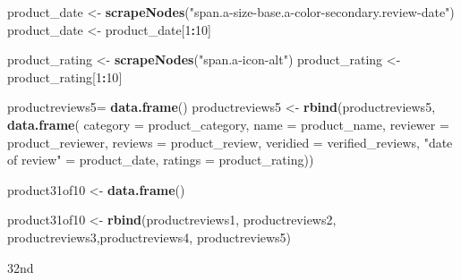 \documentclass[
]{article}
\newenvironment{Shaded}{\begin{snugshade}}{\end{snugshade}}
\newcommand{\AttributeTok}[1]{\textcolor[rgb]{0.13,0.29,0.53}{#1}}
\newcommand{\DecValTok}[1]{\textcolor[rgb]{0.00,0.00,0.81}{#1}}
\newcommand{\FunctionTok}[1]{\textcolor[rgb]{0.13,0.29,0.53}{\textbf{#1}}}
\newcommand{\NormalTok}[1]{#1}
\newcommand{\OtherTok}[1]{\textcolor[rgb]{0.56,0.35,0.01}{#1}}
\newcommand{\SpecialCharTok}[1]{\textcolor[rgb]{0.81,0.36,0.00}{\textbf{#1}}}
\newcommand{\StringTok}[1]{\textcolor[rgb]{0.31,0.60,0.02}{#1}}
\begin{document}
\begin{Shaded}
\begin{Highlighting}[]
\NormalTok{  product\_date }\OtherTok{\textless{}{-}} \FunctionTok{scrapeNodes}\NormalTok{(}\StringTok{"span.a{-}size{-}base.a{-}color{-}secondary.review{-}date"}\NormalTok{)}
\NormalTok{  product\_date }\OtherTok{\textless{}{-}}\NormalTok{ product\_date[}\DecValTok{1}\SpecialCharTok{:}\DecValTok{10}\NormalTok{]}
  
\NormalTok{  product\_rating }\OtherTok{\textless{}{-}} \FunctionTok{scrapeNodes}\NormalTok{(}\StringTok{"span.a{-}icon{-}alt"}\NormalTok{)}
\NormalTok{  product\_rating }\OtherTok{\textless{}{-}}\NormalTok{ product\_rating[}\DecValTok{1}\SpecialCharTok{:}\DecValTok{10}\NormalTok{]}
  
\NormalTok{  productreviews5}\OtherTok{=} \FunctionTok{data.frame}\NormalTok{()}
\NormalTok{  productreviews5 }\OtherTok{\textless{}{-}} \FunctionTok{rbind}\NormalTok{(productreviews5, }\FunctionTok{data.frame}\NormalTok{(}
                      \AttributeTok{category =}\NormalTok{ product\_category,}
                      \AttributeTok{name =}\NormalTok{ product\_name,}
                      \AttributeTok{reviewer =}\NormalTok{ product\_reviewer,}
                      \AttributeTok{reviews =}\NormalTok{ product\_review,}
                      \AttributeTok{veridied =}\NormalTok{ verified\_reviews,}
                      \StringTok{"date of review"} \OtherTok{=}\NormalTok{ product\_date,}
                      \AttributeTok{ratings =}\NormalTok{ product\_rating))}
  
\NormalTok{  product31of10 }\OtherTok{\textless{}{-}} \FunctionTok{data.frame}\NormalTok{()}
  
\NormalTok{  product31of10 }\OtherTok{\textless{}{-}} \FunctionTok{rbind}\NormalTok{(productreviews1, productreviews2, productreviews3,productreviews4, productreviews5)}
\end{Highlighting}
\end{Shaded}

32nd
\end{document}
